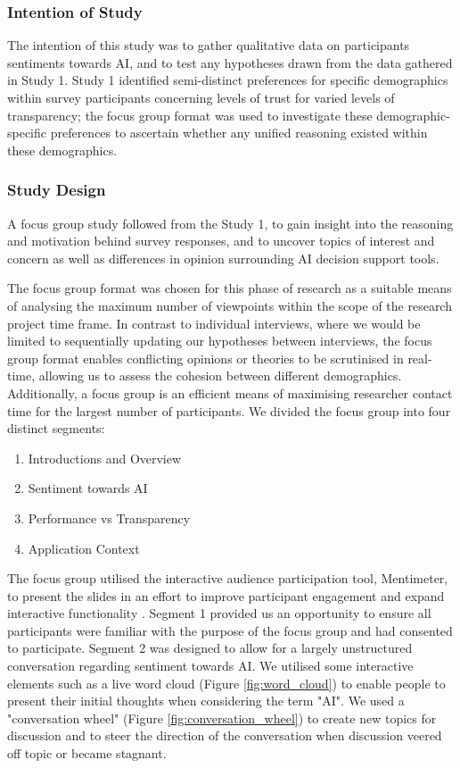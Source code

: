 \documentclass[manuscript,screen,review]{acmart}
\begin{document}
\subsubsection{Intention of Study}
\label{study2_intentions}
The intention of this study was to gather qualitative data on participants sentiments towards AI, and to test any hypotheses drawn from the data gathered in Study 1. Study 1 identified semi-distinct preferences for specific demographics within survey participants concerning levels of trust for varied levels of transparency; the focus group format was used to investigate these demographic-specific preferences to ascertain whether any unified reasoning existed within these demographics.

\subsubsection{Study Design}
\label{study2_design}
 
A focus group study followed from the Study 1, to gain insight into the reasoning and motivation behind survey responses, and to uncover topics of interest and concern as well as differences in opinion surrounding AI decision support tools.

The focus group format was chosen for this phase of research as a suitable means of analysing the maximum number of viewpoints within the scope of the research project time frame. In contrast to individual interviews, where we would be limited to sequentially updating our hypotheses between interviews, the focus group format enables conflicting opinions or theories to be scrutinised in real-time, allowing us to assess the cohesion between different demographics. Additionally, a focus group is an efficient means of maximising researcher contact time for the largest number of participants. We divided the focus group into four distinct segments:
\begin{enumerate}
    \item Introductions and Overview
    \item Sentiment towards AI
    \item Performance vs Transparency
    \item Application Context
\end{enumerate}

The focus group utilised the interactive audience participation tool, Mentimeter, to present the slides in an effort to improve participant engagement and expand interactive functionality \cite{Mayhew2020}. Segment 1 provided us an opportunity to ensure all participants were familiar with the purpose of the focus group and had consented to participate. Segment 2 was designed to allow for a largely unstructured conversation regarding sentiment towards AI. We utilised some interactive elements such as a live word cloud (Figure \ref{fig:word_cloud}) to enable people to present their initial thoughts when considering the term "AI". We used a "conversation wheel" (Figure \ref{fig:conversation_wheel}) to create new topics for discussion and to steer the direction of the conversation when discussion veered off topic or became stagnant.\\
\end{document}
